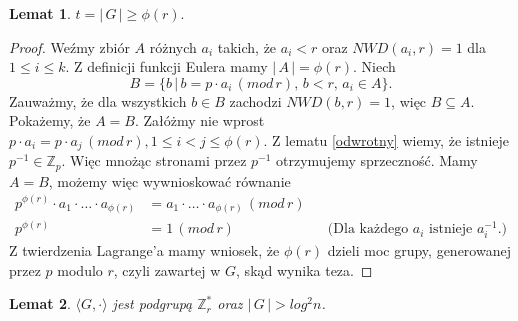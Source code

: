 \documentclass[polish,declaration,shortabstract]{iithesis}
\theoremstyle{definition}
\theoremstyle{remark} \newtheorem{observation}{Obserwacja}
\theoremstyle{plain} \newtheorem{theorem}{Twierdzenie}
\theoremstyle{plain} \newtheorem{lemma}{Lemat}
\theoremstyle{remark} \newtheorem*{remark*}{Uwaga}
\theoremstyle{reminder} \newtheorem*{reminder*}{Przypomnienie}
\begin{document}
\begin{lemma} \label{phi_r}
	$t = | \, G \, | \geq \phi(r).$
\end{lemma}
	
\begin{proof}
	Weźmy zbiór $A$ różnych $a_i$ takich, że $a_i < r$ oraz $NWD(a_i, r) = 1$ dla ${1 \leq i \leq k}$. Z definicji funkcji Eulera mamy $| \, A \, | = \phi(r)$. Niech \[B = \{b \, | \, b = p \cdot a_i \, (mod \, r), \, b < r, \, a_i \in A\}.\] Zauważmy, że dla wszystkich $b \in B$ zachodzi $NWD(b, r) = 1$, więc $B \subseteq A.$ Pokażemy, że $A = B$. Załóżmy nie wprost $p \cdot a_i = p \cdot a_j \, (mod \, r), 1 \leq i < j \leq \phi(r)$. Z lematu \ref{odwrotny} wiemy, że istnieje $p^{-1} \in \mathbb{Z}_p$. Więc mnożąc stronami przez $p^{-1}$ otrzymujemy sprzeczność. \newline
	Mamy $A = B$, możemy więc wywnioskować równanie 
	\begin{align*}
		p^{\phi(r)} \cdot a_1 \cdot \dots \cdot a_{\phi(r)} &= a_1 \cdot \dots \cdot a_{\phi(r)} \, (mod \, r) \\
		p^{\phi(r)} & = 1 \, (mod \, r) &   & \text{(Dla każdego $a_i$ istnieje $a_i^{-1}$.)} 
	\end{align*}
	Z twierdzenia Lagrange'a mamy wniosek, że $\phi(r)$ dzieli moc grupy, generowanej przez $p$ modulo $r$, czyli zawartej w $G$, skąd wynika teza.
\end{proof}

\begin{lemma}\label{el_odwr}
	$\langle G, \cdot \rangle$ jest podgrupą $\mathbb{Z}_r^*$ oraz $|\,G\,| > log^2n$.
\end{lemma}
	
\end{document}
